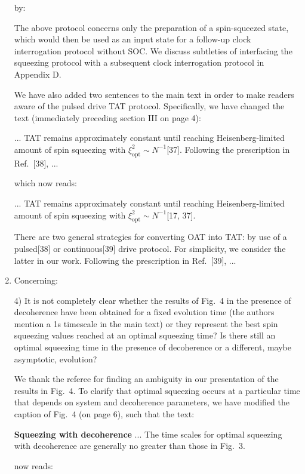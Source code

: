 \documentclass[reprint,onecolumn,12pt]{revtex4-2}
\renewcommand{\t}{\text} %
\newcommand{\blue}[1]{{\color{blue} #1}}
\newcommand{\red}[1]{{\color{red} #1}}
\newcommand{\green}[1]{{\color{ForestGreen} #1}}
\begin{document}
\begin{enumerate}
  by:

  \green{The above protocol concerns only the preparation of a
    spin-squeezed state, which would then be used as an input state
    for a follow-up clock interrogation protocol without SOC.  We
    discuss subtleties of interfacing the squeezing protocol with a
    subsequent clock interrogation protocol in Appendix D.}

  We have also added two sentences to the main text in order to make
  readers aware of the pulsed drive TAT protocol.  Specifically, we
  have changed the text (immediately preceding section III on page 4):

  \red{... TAT remains approximately constant until reaching
    Heisenberg-limited amount of spin squeezing with
    $\xi^2_{\t{opt}}\sim N^{-1}$[37].  Following the prescription in
    Ref.~[38], ...}

  which now reads:

  \green{... TAT remains approximately constant until reaching
    Heisenberg-limited amount of spin squeezing with
    $\xi^2_{\t{opt}}\sim N^{-1}$[17, 37].}

  \green{There are two general strategies for converting OAT into TAT:
    by use of a pulsed[38] or continuous[39] drive protocol.  For
    simplicity, we consider the latter in our work.  Following the
    prescription in Ref.~[39], ...}


\item Concerning:

  \blue{4) It is not completely clear whether the results of Fig.~4 in
    the presence of decoherence have been obtained for a fixed
    evolution time (the authors mention a 1s timescale in the main
    text) or they represent the best spin squeezing values reached at
    an optimal squeezing time? Is there still an optimal squeezing
    time in the presence of decoherence or a different, maybe
    asymptotic, evolution?}

  We thank the referee for finding an ambiguity in our presentation of
  the results in Fig.~4.  To clarify that optimal squeezing occurs at
  a particular time that depends on system and decoherence parameters,
  we have modified the caption of Fig.~4 (on page 6), such that the
  text:

  \red{{\bf Squeezing with decoherence} ... The time scales for
    optimal squeezing with decoherence are generally no greater than
    those in Fig.~3.}

  now reads:


\end{enumerate}
\end{document}
